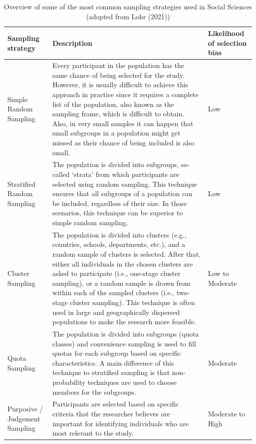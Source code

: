 \documentclass[
  letterpaper,
]{krantz}
\begin{document}
\begin{longtable}{>{\raggedright\arraybackslash}p{\dimexpr 56.25pt -2\tabcolsep-1.5\arrayrulewidth}>{\raggedright\arraybackslash}p{\dimexpr 232.50pt -2\tabcolsep-1.5\arrayrulewidth}>{\raggedright\arraybackslash}p{\dimexpr 52.50pt -2\tabcolsep-1.5\arrayrulewidth}}

\caption{\label{tbl-sampling-strategies}Overview of some of the most
common sampling strategies used in Social Sciences (adopted from Lohr
(2021))}

\tabularnewline

\toprule
Sampling strategy & Description & Likelihood of selection bias \\ 
\midrule\addlinespace[2.5pt]
Simple Random Sampling & Every participant in the population has the same chance of being selected for the study. However, it is usually difficult to achieve this approach in practice since it requires a complete list of the population, also known as the sampling frame, which is difficult to obtain. Also, in very small samples it can happen that small subgroups in a population might get missed as their chance of being included is also small. & Low \\ 
Stratified Random Sampling & The population is divided into subgroups, so-called `strata' from which participants are selected using random sampling. This technique ensures that all subgroups of a population can be included, regardless of their size. In those scenarios, this technique can be superior to simple random sampling. & Low \\ 
Cluster Sampling & The population is divided into clusters (e.g., countries, schools, departments, etc.), and a random sample of clusters is selected. After that, either all individuals in the chosen clusters are asked to participate (i.e., one-stage cluster sampling), or a random sample is drawn from within each of the sampled clusters (i.e., two-stage cluster sampling). This technique is often used in large and geographically dispersed populations to make the research more feasible. & Low to Moderate \\ 
Quota Sampling & The population is divided into subgroups (quota classes) and convenience sampling is used to fill quotas for each subgroup based on specific characteristics. A main difference of this technique to stratified sampling is that non-probability techniques are used to choose members for the subgroups. & Moderate \\ 
Purposive / Judgement Sampling & Participants are selected based on specific criteria that the researcher believes are important for identifying individuals who are most relevant to the study. & Moderate to High \\ 

\end{longtable}
\end{document}
